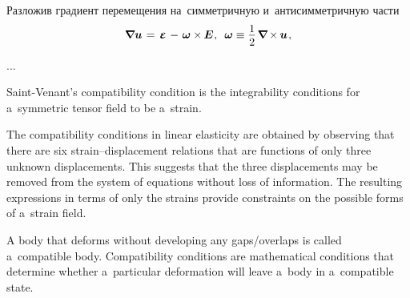 \begin{otherlanguage}{russian}

Разложив градиент перемещения на~симметричную и~антисимметричную части
\nopagebreak\vspace{.1em}\begin{equation}
\boldnabla \bm{u} \hspace{.2ex} = \tikzmark{beginSymmNablaU} \hspace{0.32ex} \mathboldepsilon \hspace{0.4ex} \tikzmark{endSymmNablaU} \hspace{-0.16ex} - \hspace{.25ex} \tikzmark{beginAsymmNablaU} \bm{\omega} \times \hspace{-0.12ex} \bm{E} \tikzmark{endAsymmNablaU} \hspace{.1ex} , \:\;
\bm{\omega} \equiv \displaystyle \onehalf \hspace{.32ex} \boldnabla \hspace{-0.12ex} \times \hspace{-0.12ex} \bm{u} \hspace{.2ex},
\end{equation}%
%

...

{\small
Saint\hbox{-\hspace{-0.2ex}}Venant’s compatibility condition is the integrability conditions for a~symmetric tensor field to be a~strain.

The compatibility conditions in linear elasticity are obtained by observing that there are six strain\hbox{--}displacement relations that are functions of only three unknown displacements. This suggests that the three displacements may be removed from the system of equations without loss of information. The resulting expressions in terms of only the strains provide constraints on the possible forms of a~strain field.

A body that deforms without developing any gaps/overlaps is called a~compatible body. Compatibility conditions are mathematical conditions that determine whether a~particular deformation will leave a~body in a~compatible state.
\par}


\end{otherlanguage}
